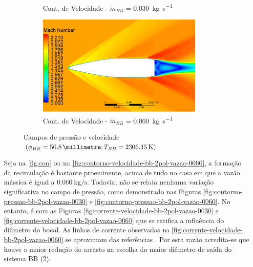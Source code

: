 \begin{figure}[!ht]
\begin{subfigure}[b]{0.47\textwidth}
        \caption{Cont. de Velocidade - \(\Dot{m}_{BB}\) = \qty{0,030}{\kilogram\per\second}}
        \label{fig:contorno-velocidade-bb-2pol-vazao0030}
    \end{subfigure}
    \hfill
	\begin{subfigure}[b]{0.47\textwidth} %
        \centering
        \includegraphics[height=5cm,width=\textwidth]{contorno-velocidade-2306K-vazao-0060-2pol.png}
        \caption{Cont. de Velocidade - \(\Dot{m}_{BB}\) = \qty{0,060}{\kilogram\per\second}}
        \label{fig:contorno-velocidade-bb-2pol-vazao0060}
    \end{subfigure}
    \caption{Campos de pressão e velocidade \(\left(\phi_{BB} = \qty{50,8}{\millimetre}; T_{BB} = \qty{2306,15}{\kelvin}\right)\)}
	\label{fig:influencia-diametro-vazao-2pol}
\end{figure}

Seja na \autoref{fig:con} ou na \autoref{fig:contorno-velocidade-bb-2pol-vazao-0060}, a formação da recirculação é bastante proeminente, acima de tudo no caso em que a vazão mássica é igual a \(\qty{0,060}{\kilogram\per\second}\). Todavia, não se relata nenhuma variação significativa no campo de pressão, como demonstrado nas Figuras \ref{fig:contorno-pressao-bb-2pol-vazao-0030} e \ref{fig:contorno-pressao-bb-2pol-vazao-0060}. No entanto, é com as Figuras \ref{fig:corrente-velocidade-bb-2pol-vazao-0030} e \ref{fig:corrente-velocidade-bb-2pol-vazao-0060} que se ratifica a influência do diâmetro do bocal. As linhas de corrente observadas na \autoref{fig:corrente-velocidade-bb-2pol-vazao-0060} se aproximam das referências \cite{Sahu1985,Mahmoud2009,Lucena2020}. Por esta razão acredita-se que houve a maior redução do arrasto na escolha do maior diâmetro de saída do sistema BB (\qty{2}{\polegada}).

